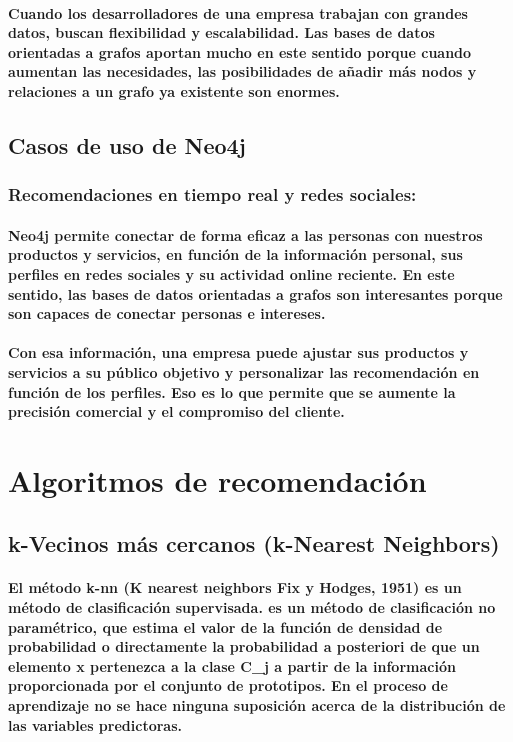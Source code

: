  	 \paragraph{Cuando los desarrolladores de una empresa trabajan con grandes datos, buscan flexibilidad y escalabilidad. Las bases de datos orientadas a grafos aportan mucho en este sentido porque cuando aumentan las necesidades, las posibilidades de añadir más nodos y relaciones a un grafo ya existente son enormes.}
\subsection{Casos de uso de Neo4j}
\subsubsection{Recomendaciones en tiempo real y redes sociales:}
	\paragraph{Neo4j permite conectar de forma eficaz a las personas con nuestros productos y servicios, en función de la información personal, sus perfiles en redes sociales y su actividad online reciente. En este sentido, las bases de datos orientadas a grafos son interesantes porque son capaces de conectar personas e intereses.}
	\paragraph{Con esa información, una empresa puede ajustar sus productos y servicios a su público objetivo y personalizar las recomendación en función de los perfiles. Eso es lo que permite que se aumente la precisión comercial y el compromiso del cliente.}

\section{Algoritmos de recomendación}
\subsection{k-Vecinos más cercanos (k-Nearest Neighbors)}
	\paragraph{El método k-nn (K nearest neighbors Fix y Hodges, 1951) es un método de clasificación supervisada. es un método de clasificación no paramétrico, que estima el valor de la función de densidad de probabilidad o directamente la probabilidad a posteriori de que un elemento x pertenezca a la clase C_j a partir de la información proporcionada por el conjunto de prototipos. En el proceso de aprendizaje no se hace ninguna suposición acerca de la distribución de las variables predictoras.}

